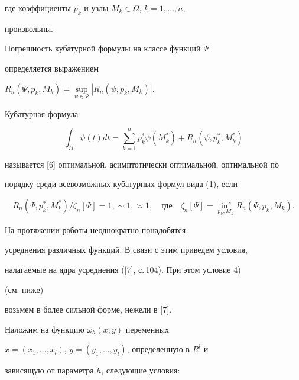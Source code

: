 где коэффициенты $p_k$ и узлы $M_k\in\Omega$, $k=1,\dotsc,n$,


произвольны.


Погрешность кубатурной формулы на классе функций $\Psi$


определяется выражением


$R_n(\Psi ,p_k,M_k)=\sup\limits_{\psi\in\Psi }| R_n(\psi,p_k,M_k)|$.


Кубатурная формула


$$


\int_\Omega \psi(t)dt=\sum_{k=1}^n


p^{*}_k\psi(M^{*}_k)+R_n(\psi,p^{*}_k,M^{*}_k)


$$


называется [6] оптимальной, асимптотически оптимальной, оптимальной по


порядку среди всевозможных кубатурных формул вида (1), если


$$


R_n(\Psi ,p^{*}_k, M^{*}_k)/\zeta_n[\Psi]=1,


\sim 1,\asymp 1,


\quad\text{где}\quad


\zeta_n[\Psi ]=\inf_{p_k,M_k} R_n(\Psi ,p_k,M_k).


$$





На протяжении работы неоднократно понадобятся


усреднения различных функций. В связи с этим приведем условия,


налагаемые на ядра усреднения ([7], с.\,104). При этом условие 4)


(см. ниже)


возьмем в более сильной форме, нежели в [7].





Наложим на функцию $\omega_h(x,y)$ переменных


$x=(x_1,\dotsc,x_l)$, $y=(y_1,\dotsc, y_l)$, определенную в $R^l$ и


зависящую от параметра $h$, следующие условия:


